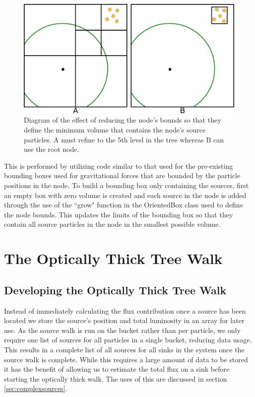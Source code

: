 \begin{figure}[H]
    \centering
    \includegraphics[width=\textwidth]{plots/CH3/sourceBox.png}
    \caption{Diagram of the effect of reducing the node's bounds so that they define the minimum volume that contains the node's source particles. A must refine to the 5th level in the tree whereas B can use the root node.}
    \label{fig:sourceBoxes}
\end{figure}

This is performed by utilizing code similar to that used for the pre-existing bounding boxes used for gravitational forces that are bounded by the particle positions in the node. To build a bounding box only containing the sources, first an empty box with zero volume is created and each source in the node is added through the use of the ``grow" function in the OrientedBox class used to define the node bounds. This updates the limits of the bounding box so that they contain all source particles in the node in the smallest possible volume.

\section{The Optically Thick Tree Walk}

\subsection{Developing the Optically Thick Tree Walk}

Instead of immediately calculating the flux contribution once a source has been located we store the source's position and total luminosity in an array for later use. As the source walk is run on the bucket rather than per particle, we only require one list of sources for all particles in a single bucket, reducing data usage. This results in a complete list of all sources for all sinks in the system once the source walk is complete. While this requires a large amount of data to be stored it has the benefit of allowing us to estimate the total flux on a sink before starting the optically thick walk. The uses of this are discussed in section \ref{sec:complexsources}.

